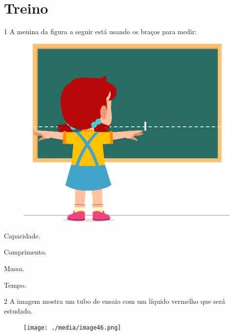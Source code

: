 

\pagebreak
\section*{Treino}

\num{1} A menina da figura a seguir está usando os braços para medir:


\begin{figure}[htpb!]
\centering
\includegraphics[width=.5\textwidth]{./media/image45.png}
\end{figure}

\begin{escolha}[itemsep=-5pt]
\item Capacidade.

\item Comprimento.

\item Massa.

\item Tempo.
\end{escolha}

\num{2} A imagem mostra um tubo de ensaio com um líquido vermelho que será estudado.


\begin{figure}[htpb!]
\centering
\texttt{[image: ./media/image46.png]}
\end{figure}

